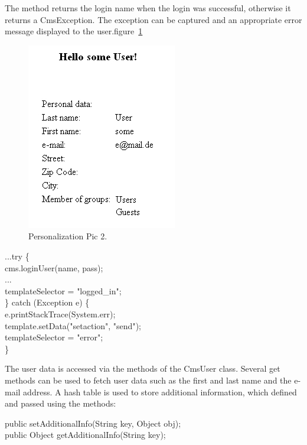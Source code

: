 The method returns the login name when the login was successful,
otherwise it returns a {\class CmsException}. The exception can be captured and
an appropriate error message displayed to the user.{figure~\ref{HelloUser}}

\begin{figure}
\begin{center}
\includegraphics[clip,width=0.4\linewidth]{pics/modules/49}
\end{center}
\caption[Personalization Pic 2]{Personalization Pic 2.}
\label{HelloUser}
\end{figure}

\begin{java}
...try \{\\
cms.loginUser(name, pass);\\
\jtabc                ...\\
\jtabc                templateSelector = "logged\_in";\\
\jtaba          \} catch (Exception e) \{\\
\jtabc                e.printStackTrace(System.err);\\
\jtabc                template.setData("setaction", "send");\\
\jtabc                templateSelector = "error";\\
\jtaba        \}\\
\end{java}

The user data is accessed via the methods of the {\class CmsUser} class. Several
get methods can be used to fetch user data such as the first and last
name and the e-mail address. A hash table is used to store additional
information, which defined and passed using the methods:



\begin{java}
public setAdditionalInfo(String key, Object obj);\\
public Object getAdditionalInfo(String key);\\
\end{java}



